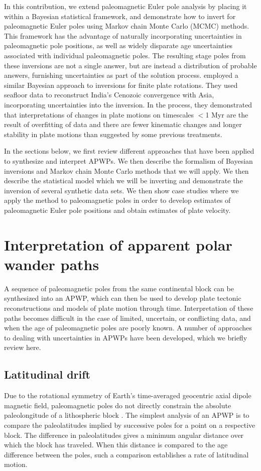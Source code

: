 \documentclass[11pt,letterpaper]{article}
\begin{document}
In this contribution, we extend paleomagnetic Euler pole analysis by placing it within a Bayesian statistical framework, and demonstrate how to invert for paleomagnetic Euler poles using Markov chain Monte Carlo (MCMC) methods. This framework has the advantage of naturally incorporating uncertainties in paleomagnetic pole positions, as well as widely disparate age uncertainties associated with individual paleomagnetic poles. The resulting stage poles from these inversions are not a single answer, but are instead a distribution of probable answers, furnishing uncertainties as part of the solution process. \cite{Iaffaldano2012a} employed a similar Bayesian approach to inversions for finite plate rotations. They used seafloor data to reconstruct India's Cenozoic convergence with Asia, incorporating uncertainties into the inversion. In the process, they demonstrated that interpretations of changes in plate motions on timescales $<$1 Myr are the result of overfitting of data and there are fewer kinematic changes and longer stability in plate motions than suggested by some previous treatments.

In the sections below, we first review different approaches that have been applied to synthesize and interpret APWPs. We then describe the formalism of Bayesian inversions and Markov chain Monte Carlo methods that we will apply. We then describe the statistical model which we will be inverting and demonstrate the inversion of several synthetic data sets. We then show case studies where we apply the method to paleomagnetic poles in order to develop estimates of paleomagnetic Euler pole positions and obtain estimates of plate velocity.

\section*{Interpretation of apparent polar wander paths}

A sequence of paleomagnetic poles from the same continental block can be synthesized into an APWP, which can then be used to develop plate tectonic reconstructions and models of plate motion through time. Interpretation of these paths becomes difficult in the case of limited, uncertain, or conflicting data, and when the age of paleomagnetic poles are poorly known. A number of approaches to dealing with uncertainties in APWPs have been developed, which we briefly review here.

\subsection*{Latitudinal drift}
Due to the rotational symmetry of Earth's time-averaged geocentric axial dipole magnetic field, paleomagnetic poles do not directly constrain the absolute paleolongitude of a lithospheric block \citep{Butler1992a}. The simplest analysis of an APWP is to compare the paleolatitudes implied by successive poles for a point on a respective block. The difference in paleolatitudes gives a minimum angular distance over which the block has traveled.  When this distance is compared to the age difference between the poles, such a comparison establishes a rate of latitudinal motion.
\end{document}
